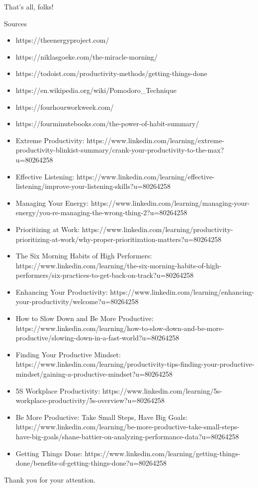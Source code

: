 
\begin{frame}{That's all, folks!}
  \begin{block}{Sources}
    \begin{itemize}
      \item https://theenergyproject.com/
      \item https://niklasgoeke.com/the-miracle-morning/
      \item https://todoist.com/productivity-methods/getting-things-done
      \item https://en.wikipedia.org/wiki/Pomodoro\_Technique
      \item https://fourhourworkweek.com/
      \item https://fourminutebooks.com/the-power-of-habit-summary/
      \item Extreme Productivity: https://www.linkedin.com/learning/extreme-productivity-blinkist-summary/crank-your-productivity-to-the-max?u=80264258
      \item Effective Listening: https://www.linkedin.com/learning/effective-listening/improve-your-listening-skills?u=80264258
      \item Managing Your Energy: https://www.linkedin.com/learning/managing-your-energy/you-re-managing-the-wrong-thing-2?u=80264258
      \item Prioritizing at Work: https://www.linkedin.com/learning/productivity-prioritizing-at-work/why-proper-prioritization-matters?u=80264258
      \item The Six Morning Habits of High Performers: https://www.linkedin.com/learning/the-six-morning-habits-of-high-performers/six-practices-to-get-back-on-track?u=80264258
      \item Enhancing Your Productivity: https://www.linkedin.com/learning/enhancing-your-productivity/welcome?u=80264258
      \item How to Slow Down and Be More Productive: https://www.linkedin.com/learning/how-to-slow-down-and-be-more-productive/slowing-down-in-a-fast-world?u=80264258
      \item Finding Your Productive Mindset: https://www.linkedin.com/learning/productivity-tips-finding-your-productive-mindset/gaining-a-productive-mindset?u=80264258
      \item 5S Workplace Productivity: https://www.linkedin.com/learning/5s-workplace-productivity/5s-overview?u=80264258
      \item Be More Productive: Take Small Steps, Have Big Goals: https://www.linkedin.com/learning/be-more-productive-take-small-steps-have-big-goals/shane-battier-on-analyzing-performance-data?u=80264258
      \item Getting Things Done: https://www.linkedin.com/learning/getting-things-done/benefits-of-getting-things-done?u=80264258
    \end{itemize}
  \end{block}

  \begin{block}{}
    Thank you for your attention. 
  \end{block}
\end{frame}

